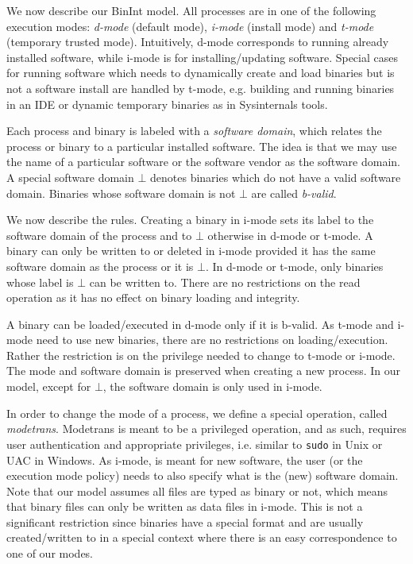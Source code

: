 We now describe our BinInt model.
All processes are in one of the following execution modes:
{\em d-mode} (default mode), {\em i-mode} (install mode) and
{\em t-mode} (temporary trusted mode).
Intuitively, d-mode corresponds to running already installed software,
while i-mode is for installing/updating software.
Special cases for running software
which needs to dynamically create and load binaries but is not a software
install are handled by t-mode,
e.g. building and running binaries in an IDE
or dynamic temporary binaries as in Sysinternals tools.

Each process and binary is labeled with a {\em software domain}, which
relates the process or binary to a particular installed software.
The idea is that we may use the name of a particular software or
the software vendor as the software domain.
A special software domain $\bot$ denotes binaries
which do not have a valid software domain.
Binaries whose software domain is not $\bot$ are called {\em b-valid}.

We now describe the rules.
Creating a binary in i-mode sets its label to the software domain
of the process and to $\bot$ otherwise in d-mode or t-mode.
A binary can only be written to or deleted in i-mode provided
it has the same software domain as the process or it is $\bot$.
In d-mode or t-mode, only binaries whose label is $\bot$ can be written to.
There are no restrictions on the read operation as it has no effect on binary
loading and integrity.

A binary can be loaded/executed in d-mode only if it is b-valid.
As t-mode and i-mode need to use new binaries, there are no restrictions
on loading/execution. 
Rather the restriction is on the privilege needed to change to t-mode or i-mode.
The mode and software domain is preserved when creating a new process.
In our model, except for $\bot$,
the software domain is only used in i-mode.

In order to change the mode of a process, we define a
special operation, called {\em modetrans}.
Modetrans is meant to be a privileged operation, and as such,
requires user authentication and appropriate privileges, i.e.
similar to {\tt sudo} in Unix or UAC in Windows.
As i-mode, is meant for new software, the user (or the execution mode policy)
needs to also specify what is the (new) software domain.
Note that our model assumes all files are typed as binary or not,
which means that binary files can only be written as data files in
i-mode.
This is not a significant restriction since binaries have a special format
and are usually created/written to in a special context where there is
an easy correspondence to one of our modes.

